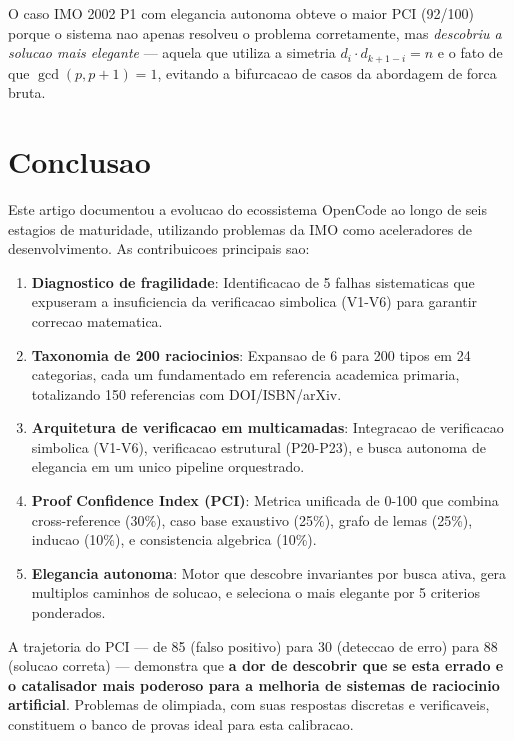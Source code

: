 \documentclass[5p]{elsarticle}
\begin{document}
O caso IMO 2002 P1 com elegancia autonoma obteve o maior PCI (92/100) porque
o sistema nao apenas resolveu o problema corretamente, mas \textit{descobriu
a solucao mais elegante} — aquela que utiliza a simetria $d_i\cdot d_{k+1-i}=n$
e o fato de que $\gcd(p,p+1)=1$, evitando a bifurcacao de casos da abordagem
de forca bruta.

\section{Conclusao}

Este artigo documentou a evolucao do ecossistema OpenCode ao longo de seis
estagios de maturidade, utilizando problemas da IMO como aceleradores de
desenvolvimento. As contribuicoes principais sao:

\begin{enumerate}[label=(\arabic*)]
  \item \textbf{Diagnostico de fragilidade}: Identificacao de 5 falhas
    sistematicas que expuseram a insuficiencia da verificacao simbolica
    (V1-V6) para garantir correcao matematica.
  \item \textbf{Taxonomia de 200 raciocinios}: Expansao de 6 para 200 tipos
    em 24 categorias, cada um fundamentado em referencia academica primaria,
    totalizando 150 referencias com DOI/ISBN/arXiv.
  \item \textbf{Arquitetura de verificacao em multicamadas}: Integracao de
    verificacao simbolica (V1-V6), verificacao estrutural (P20-P23), e
    busca autonoma de elegancia em um unico pipeline orquestrado.
  \item \textbf{Proof Confidence Index (PCI)}: Metrica unificada de 0-100
    que combina cross-reference (30\%), caso base exaustivo (25\%), grafo de
    lemas (25\%), inducao (10\%), e consistencia algebrica (10\%).
  \item \textbf{Elegancia autonoma}: Motor que descobre invariantes por busca
    ativa, gera multiplos caminhos de solucao, e seleciona o mais elegante
    por 5 criterios ponderados.
\end{enumerate}

A trajetoria do PCI — de 85 (falso positivo) para 30 (deteccao de erro) para
88 (solucao correta) — demonstra que \textbf{a dor de descobrir que se esta
errado e o catalisador mais poderoso para a melhoria de sistemas de raciocinio
artificial}. Problemas de olimpiada, com suas respostas discretas e verificaveis,
constituem o banco de provas ideal para esta calibracao.
\end{document}
